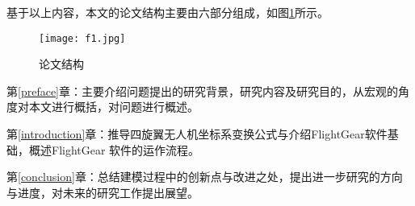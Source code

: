 基于以上内容，本文的论文结构主要由六部分组成，如图\ref{fig1}所示。
\vspace{10pt}
\begin{figure}[!ht]
\centering
\texttt{[image: f1.jpg]}
\caption{论文结构 }
\label{fig1}
\end{figure}


第\ref{preface}章：主要介绍问题提出的研究背景，研究内容及研究目的，从宏观的角度对本文进行概括，对问题进行概述。

第\ref{introduction}章：推导四旋翼无人机坐标系变换公式与介绍FlightGear软件基础，概述FlightGear 软件的运作流程。

第\ref{conclusion}章：总结建模过程中的创新点与改进之处，提出进一步研究的方向与进度，对未来的研究工作提出展望。

